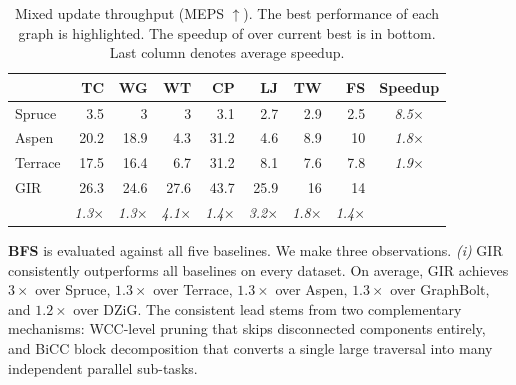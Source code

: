 \begin{table}[t]
\centering
\setlength{\tabcolsep}{4pt}
\caption{Mixed update throughput (MEPS $\uparrow$).
The best performance of each graph is highlighted. The speedup of {\name} over current best is in bottom. Last column denotes average speedup.}
\label{tab:throughput_summary}
\begin{tabular}{l r r r r r r r c}
\toprule
 & \textbf{TC} & \textbf{WG} & \textbf{WT} & \textbf{CP} & \textbf{LJ} & \textbf{TW} & \textbf{FS} & \textbf{Speedup} \\
\midrule
Spruce  &   3.5  &   3  &   3  &   3.1  &   2.7  &   2.9  &   2.5  &   \textit{8.5}$\times$  \\
Aspen   &  20.2  &  18.9  &   4.3  &  31.2  &   4.6  &   8.9  &  10  &   \textit{1.8}$\times$  \\
Terrace &  17.5  &  16.4  &   6.7  &  31.2  &   8.1  &   7.6  &   7.8  &   \textit{1.9}$\times$  \\
GIR     &  \cellcolor[HTML]{CBCEFB}26.3  &  \cellcolor[HTML]{CBCEFB}24.6  &  \cellcolor[HTML]{CBCEFB}27.6  &  \cellcolor[HTML]{CBCEFB}43.7  &  \cellcolor[HTML]{CBCEFB}25.9  &  \cellcolor[HTML]{CBCEFB}16  &  \cellcolor[HTML]{CBCEFB}14  &        \\
        & \textit{1.3}$\times$ & \textit{1.3}$\times$ & \textit{4.1}$\times$ & \textit{1.4}$\times$ & \textit{3.2}$\times$ & \textit{1.8}$\times$ & \textit{1.4}$\times$ &        \\
\bottomrule
\end{tabular}
\end{table}



\textbf{BFS} is evaluated against all five baselines.
We make three observations.
\textit{(i)} GIR consistently outperforms all baselines on every dataset.
On average, GIR achieves $3\times$ over Spruce, $1.3\times$ over Terrace, $1.3\times$ over Aspen, $1.3\times$ over GraphBolt, and $1.2\times$ over DZiG.
The consistent lead stems from two complementary mechanisms: WCC-level pruning that skips disconnected components entirely, and BiCC block decomposition that converts a single large traversal into many independent parallel sub-tasks.

